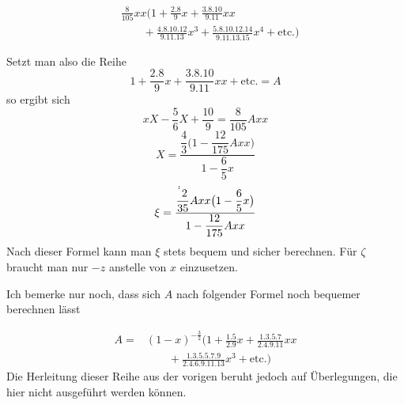 \[
\begin{aligned}
&\frac{8}{105}xx\bigl(1+\frac{2\mathord{.}8}{9}x+\frac{3\mathord{.}8\mathord{.}10}{9\mathord{.}11}xx\\
&\qquad+\frac{4\mathord{.}8\mathord{.}10\mathord{.}12}{9\mathord{.}11\mathord{.}13}x^3+\frac{5\mathord{.}8\mathord{.}10\mathord{.}12\mathord{.}14}{9\mathord{.}11\mathord{.}13\mathord{.}15}x^4+\text{etc.}\bigr)
\end{aligned}
\]
\par\indent Setzt man also die Reihe
\[
1+\frac{2\mathord{.}8}{9}x+\frac{3\mathord{.}8\mathord{.}10}{9\mathord{.}11}xx+\text{etc.}=A
\]
\noindent so ergibt sich
\[
xX-\frac{5}{6}X+\frac{10}{9}=\frac{8}{105}Axx
\]
\[
X=\frac{\dfrac{4}{3}\bigl(1-\dfrac{12}{175}Axx\bigr)}{1-\dfrac{6}{5}x}
\]
\[
\xi=\frac{\dfrac{\mathord{\raisebox{7bp}{\ObservedNumeratorMark}\,}2}{35}Axx\bigl(1-\dfrac{6}{5}x\bigr)}{1-\dfrac{12}{175}Axx}
\]
\noindent Nach dieser Formel kann man $\xi$ stets bequem und sicher berechnen. Für $\zeta$ braucht man nur $-z$ anstelle von $x$ einzusetzen.

\par\indent Ich bemerke nur noch, dass sich $A$ nach folgender Formel noch bequemer berechnen lässt

\[
\begin{aligned}
A={}&(1-x)^{-\frac{3}{2}}\bigl(1+\frac{1\mathord{.}5}{2\mathord{.}9}x+\frac{1\mathord{.}3\mathord{.}5\mathord{.}7}{2\mathord{.}4\mathord{.}9\mathord{.}11}xx\\
&\qquad+\frac{1\mathord{.}3\mathord{.}5\mathord{.}5\mathord{.}7\mathord{.}9}{2\mathord{.}4\mathord{.}6\mathord{.}9\mathord{.}11\mathord{.}13}x^3+\text{etc.}\bigr)
\end{aligned}
\]
\noindent Die Herleitung dieser Reihe aus der vorigen beruht jedoch auf Überlegungen, die hier nicht ausgeführt werden können.
